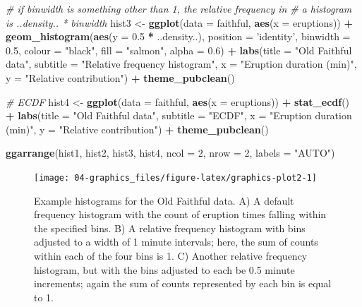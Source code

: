 \documentclass[english,10pt,a4paper,oneside]{book}
\newenvironment{Shaded}{\begin{snugshade}}{\end{snugshade}}
\newcommand{\CommentTok}[1]{\textcolor[rgb]{0.56,0.35,0.01}{\textit{#1}}}
\newcommand{\DataTypeTok}[1]{\textcolor[rgb]{0.13,0.29,0.53}{#1}}
\newcommand{\DecValTok}[1]{\textcolor[rgb]{0.00,0.00,0.81}{#1}}
\newcommand{\FloatTok}[1]{\textcolor[rgb]{0.00,0.00,0.81}{#1}}
\newcommand{\KeywordTok}[1]{\textcolor[rgb]{0.13,0.29,0.53}{\textbf{#1}}}
\newcommand{\NormalTok}[1]{#1}
\newcommand{\OperatorTok}[1]{\textcolor[rgb]{0.81,0.36,0.00}{\textbf{#1}}}
\newcommand{\StringTok}[1]{\textcolor[rgb]{0.31,0.60,0.02}{#1}}
\theoremstyle{definition}
\theoremstyle{definition}
\theoremstyle{definition}
\theoremstyle{remark}
\begin{document}
\begin{Shaded}
\begin{Highlighting}[]
\CommentTok{# if binwidth is something other than 1, the relative frequency in}
\CommentTok{# a histogram is ..density.. * binwidth}
\NormalTok{hist3 <-}\StringTok{ }\KeywordTok{ggplot}\NormalTok{(}\DataTypeTok{data =}\NormalTok{ faithful, }\KeywordTok{aes}\NormalTok{(}\DataTypeTok{x =}\NormalTok{ eruptions)) }\OperatorTok{+}
\StringTok{  }\KeywordTok{geom_histogram}\NormalTok{(}\KeywordTok{aes}\NormalTok{(}\DataTypeTok{y =} \FloatTok{0.5} \OperatorTok{*}\StringTok{ }\NormalTok{..density..),}
                 \DataTypeTok{position =} \StringTok{'identity'}\NormalTok{, }\DataTypeTok{binwidth =} \FloatTok{0.5}\NormalTok{,}
                 \DataTypeTok{colour =} \StringTok{"black"}\NormalTok{, }\DataTypeTok{fill =} \StringTok{"salmon"}\NormalTok{, }\DataTypeTok{alpha =} \FloatTok{0.6}\NormalTok{) }\OperatorTok{+}
\StringTok{  }\KeywordTok{labs}\NormalTok{(}\DataTypeTok{title =} \StringTok{"Old Faithful data"}\NormalTok{,}
       \DataTypeTok{subtitle =} \StringTok{"Relative frequency histogram"}\NormalTok{,}
       \DataTypeTok{x =} \StringTok{"Eruption duration (min)"}\NormalTok{,}
       \DataTypeTok{y =} \StringTok{"Relative contribution"}\NormalTok{) }\OperatorTok{+}\StringTok{ }\KeywordTok{theme_pubclean}\NormalTok{()}

\CommentTok{# ECDF}
\NormalTok{hist4 <-}\StringTok{ }\KeywordTok{ggplot}\NormalTok{(}\DataTypeTok{data =}\NormalTok{ faithful, }\KeywordTok{aes}\NormalTok{(}\DataTypeTok{x =}\NormalTok{ eruptions)) }\OperatorTok{+}\StringTok{ }
\StringTok{  }\KeywordTok{stat_ecdf}\NormalTok{() }\OperatorTok{+}
\StringTok{  }\KeywordTok{labs}\NormalTok{(}\DataTypeTok{title =} \StringTok{"Old Faithful data"}\NormalTok{,}
       \DataTypeTok{subtitle =} \StringTok{"ECDF"}\NormalTok{,}
       \DataTypeTok{x =} \StringTok{"Eruption duration (min)"}\NormalTok{,}
       \DataTypeTok{y =} \StringTok{"Relative contribution"}\NormalTok{) }\OperatorTok{+}\StringTok{ }\KeywordTok{theme_pubclean}\NormalTok{()}

\KeywordTok{ggarrange}\NormalTok{(hist1, hist2, hist3, hist4, }\DataTypeTok{ncol =} \DecValTok{2}\NormalTok{, }\DataTypeTok{nrow =} \DecValTok{2}\NormalTok{, }\DataTypeTok{labels =} \StringTok{"AUTO"}\NormalTok{)}
\end{Highlighting}
\end{Shaded}

\begin{figure}
\texttt{[image: 04-graphics\_files/figure-latex/graphics-plot2-1]} \caption{Example histograms for the Old Faithful data. A) A default frequency histogram with the count of eruption times falling within the specified bins. B) A relative frequency histogram with bins adjusted to a width of 1 minute intervals; here, the sum of counts within each of the four bins is 1. C) Another relative frequency histogram, but with the bins adjusted to each be 0.5 minute increments; again the sum of counts represented by each bin is equal to 1.}\label{fig:graphics-plot2}
\end{figure}
\end{document}
